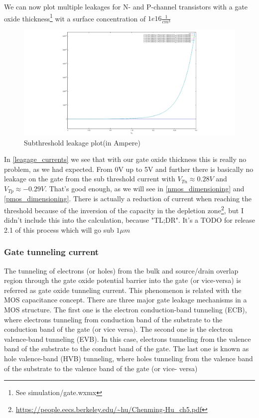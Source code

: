 We can now plot multiple leakages for N- and P-channel transistors with a gate oxide thickness\footnote{See simulation/gate.wxmx} wit a surface concentration of $1e16\frac{1}{cm^3}$
\begin{figure}[H]
	\centering
	\includegraphics[width=\textwidth]{subthreshold_leagage.png}
	\caption{Subthreshold leakage plot(in Ampere)}
	\label{leagage_currents}
\end{figure}
In \autoref{leagage_currents} we see that with our gate oxide thickness this is really no problem, as we had expected.
From 0V up to 5V and further there is basically no leakage on the gate from the sub threshold current with $V_{Tn} \approx 0.28V$ and $V_{Tp} \approx -0.29V$.
That's good enough, as we will see in \autoref{nmos_dimensioning} and \autoref{pmos_dimensioning}.
There is actually a reduction of current when reaching the threshold because of the inversion of the capacity in the depletion zone\footnote{\url{https://people.eecs.berkeley.edu/~hu/Chenming-Hu_ch5.pdf}}, but I didn't include this into the calculation, because "TL;DR".
It's a TODO for release 2.1 of this process which will go sub $1 \mu m$

\subsubsection{Gate tunneling current}

The tunneling of electrons (or holes) from the bulk and source/drain overlap region through the gate oxide potential barrier into the gate (or vice-versa) is referred as gate oxide tunneling current.
This phenomenon is related with the MOS capacitance concept.
There are three major gate leakage mechanisms in a MOS structure.
The first one is the electron conduction-band tunneling (ECB), where electrons tunneling from conduction band of the substrate to the conduction band of the gate (or vice versa).
The second one is the electron valence-band tunneling (EVB). In this case, electrons tunneling from the valence band of the substrate to the conduct band of the gate.
The last one is known as hole valence-band (HVB) tunneling, where holes tunneling from the valence band of the substrate to the valence band of the gate (or vice- versa)

